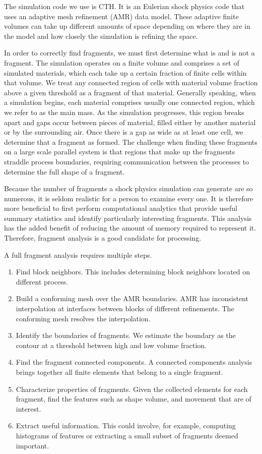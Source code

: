 The simulation code we use is CTH.  It is an Eulerian
shock physics code that uses an adaptive mesh refinement (AMR) data model.
These adaptive finite volumes can take up different amounts of space
depending on where they are in the model and how closely the simulation is
refining the space.

In order to correctly find fragments, we must first determine what is and
is not a fragment.  The simulation operates on a finite volume and
comprises a set of simulated materials, which each take up a certain
fraction of finite cells within that volume.  We treat any connected region
of cells with material volume fraction above a given threshold as a
fragment of that material.  Generally speaking, when a simulation begins,
each material comprises usually one connected region, which we refer to as
the main mass.  As the simulation progresses, this region breaks apart and
gaps occur between pieces of material, filled either by another material or
by the surrounding air.  Once there is a gap as wide as at least one cell,
we determine that a fragment as formed.  The challenge when finding these
fragments on a large scale parallel system is that regions that make up the
fragments straddle process boundaries, requiring communication between the
processes to determine the full shape of a fragment.

Because the number of fragments a shock physics simulation can generate are
so numerous, it is seldom realistic for a person to examine every one.  It
is therefore more beneficial to first perform computational analytics that
provide useful summary statistics and identify particularly interesting
fragments.  This analysis has the added benefit of reducing the amount of
memory required to represent it.  Therefore, fragment analysis is a good
candidate for \insitu processing.

A full fragment analysis requires multiple steps.
\begin{enumerate}
\item Find block neighbors.  This includes determining block neighbors
  located on different process.
\item Build a conforming mesh over the AMR boundaries.  AMR has
  inconsistent interpolation at interfaces between blocks of different
  refinements.  The conforming mesh resolves the interpolation.
\item Identify the boundaries of fragments.  We estimate the boundary as
  the contour at a threshold between high and low volume fraction.
\item Find the fragment connected components.  A connected components
  analysis brings together all finite elements that belong to a single
  fragment.
\item Characterize properties of fragments.  Given the collected elements
  for each fragment, find the features such as shape volume, and movement
  that are of interest.
\item Extract useful information.  This could involve, for example,
  computing histograms of features or extracting a small subset of
  fragments deemed important.
\end{enumerate}

